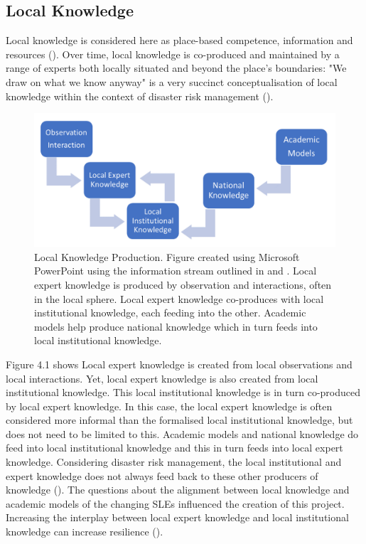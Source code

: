 \subsection{Local Knowledge}

Local knowledge is considered here as place-based competence, information and resources (\cite{setten_we_2019}). Over time,  local knowledge is co-produced and maintained by a range of experts both locally situated and beyond the place's boundaries: "We draw on what we know anyway" is a very succinct conceptualisation of local knowledge within the context of disaster risk management (\cite{setten_we_2019}). 

\begin{figure}[h]
    \centering
    \includegraphics[width=1\textwidth]{fig_theory/local knowledge accumulation.png}
    \caption{Local Knowledge Production. Figure created using Microsoft PowerPoint using the information stream outlined in \cite{setten_we_2019} and \cite{rod_integrated_2012}. Local expert knowledge is produced by observation and interactions, often in the local sphere. Local expert knowledge co-produces with local institutional knowledge, each feeding into the other. Academic models help produce national knowledge which in turn feeds into local institutional knowledge.}
    \label{fig:local_knowledge}
\end{figure}


Figure 4.1 shows Local expert knowledge is created from local observations and local interactions. Yet, local expert knowledge is also created from local institutional knowledge. This local institutional knowledge is in turn co-produced by local expert knowledge. In this case, the local expert knowledge is often considered more informal than the formalised local institutional knowledge, but does not need to be limited to this.  Academic models and national knowledge do feed into local institutional knowledge and this in turn feeds into local expert knowledge. Considering disaster risk management, the local institutional and expert knowledge does not always feed back to these other producers of knowledge (\cite{rod_integrated_2012}). The questions about the alignment between local knowledge and academic models of the changing SLEs influenced the creation of this project. Increasing the interplay between local expert knowledge and local institutional knowledge can increase resilience (\cite{setten_we_2019}).


